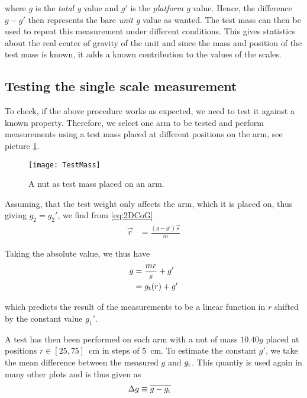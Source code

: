 \documentclass[journal]{IEEEtran}
\begin{document}
where $g$ is the \emph{total g} value and $g'$ is the \emph{platform g} value. Hence, the difference $g-g'$ then represents the bare \emph{unit g} value as wanted.
The test mass can then be used to repeat this measurement under different conditions.
This gives statistics about the real center of gravity of the unit and since the mass and position of the test mass is known, it adds a known contribution to the values of the scales.

\subsection{Testing the single scale measurement}
\label{sec:SingleScale}

To check, if the above procedure works as expected, we need to test it against a known property.
Therefore, we select one arm to be tested and perform measurements using a test mass placed at different positions on the arm, see picture \ref{fig:TestMass}.

\begin{figure}[b]
	\centering
	\texttt{[image: TestMass]}
	\caption{A nut as test mass placed on an arm.}
	\label{fig:TestMass}
\end{figure}

Assuming, that the test weight only affects the arm, which it is placed on, thus giving $g_2 = g_2'$, we find from \eqref{eq:2DCoG}
\begin{align}
	\vec{r} & = \frac{(g - g') \vec{s}}{m}
\end{align}

Taking the absolute value, we thus have
\begin{align}
	g & = \frac{m r}{s} + g'\\
	& = g_{\textup{t}}(r) + g'
	\label{eq:gt}
\end{align}

which predicts the result of the measurements to be a linear function in $r$ shifted by the constant value $g_1'$.

A test has then been performed on each arm with a nut of mass $10.40 \unit{g}$ placed at positions $r \in [25, 75]$~cm in steps of 5~cm.
To estimate the constant $g'$, we take the mean difference between the measured $g$ and $g_{\textup{t}}$.
This quantiy is used again in many other plots and is thus given as
\begin{align}
	\Delta g & \equiv \overline{g - g_{\textup{t}}}
	\label{eq:DeltaG}
\end{align}
\end{document}
